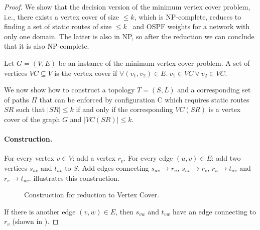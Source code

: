 \begin{proof}
We show that the decision version of the minimum 
vertex cover problem, i.e., there exists a vertex cover
of size $ \leq k$, which is NP-complete, 
reduces to finding a set of static routes 
of size $ \leq k$ \
and OSPF weights for a network with only one domain. 
The latter is also in NP, so after the reduction we 
can conclude that it is also NP-complete.

Let $G = (V,E)$ be an instance of the 
minimum vertex cover problem. A set of
vertices $VC \subseteq V$ is the vertex cover
if $\forall (v_1, v_2) \in E. ~v_1 \in VC \vee v_2 \in VC$. 

We now show how to construct a topology $T=(S,L)$ 
and a corresponding set of paths $\Pi$ that can be enforced 
by configuration C which requires static routes $SR$ such that $|SR| \leq k$  
if and only if the corresponding $VC(SR)$ is a vertex cover of 
the graph $G$ and $|VC(SR)| \leq k$.

\paragraph{Construction.}
For every vertex $v \in V$: add a vertex $r_v$.
For every edge $(u,v) \in E$: add two vertices $s_{uv}$
and $t_{uv}$ to $S$. Add edges
connecting $s_{uv} \rightarrow r_{u}$, $s_{uv} \rightarrow r_{v}$,
$r_{u} \rightarrow t_{uv}$ and $r_{v} \rightarrow t_{uv}$. 
 illustrates this construction.
\begin{figure}[H]
	\centering
	\caption{Construction for reduction to Vertex Cover.}
	\label{fig:rfcomplexity}
\end{figure}
If there is another edge $(v,w) \in E$, then
$s_{vw}$ and $t_{vw}$ have an edge connecting to $r_v$ (shown
in ). 


\end{proof}
